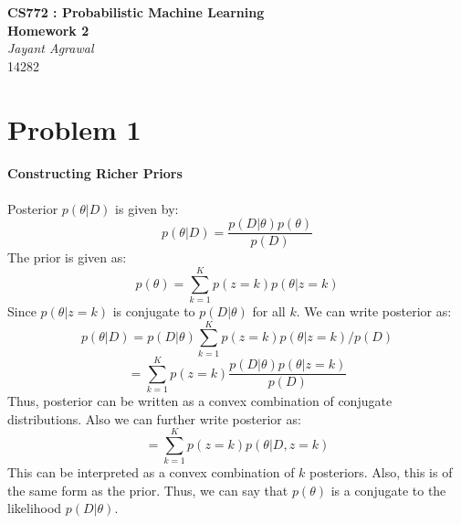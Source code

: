 \documentclass{article}
\begin{document}

\begin{center}
\textbf{\huge CS772 : Probabilistic Machine Learning} \\
\textbf{\huge Homework 2} \\
\vspace{5pt}
\textit{\Large Jayant Agrawal} \\
14282
\end{center}

\section*{Problem 1}
\textbf{Constructing Richer Priors \\ \\}
Posterior $p(\theta|D)$ is given by:
$$p(\theta|D) = \frac{p(D|\theta)p(\theta)}{p(D)}$$
The prior is given as:
$$p(\theta) = \sum_{k=1}^Kp(z=k)p(\theta|z=k)$$
Since $p(\theta|z=k)$ is conjugate to $p(D|\theta)$ for all $k$. We can write posterior as:
$$p(\theta|D) = p(D|\theta)\sum_{k=1}^Kp(z=k)p(\theta|z=k)/p(D)$$
$$ = \sum_{k=1}^K p(z=k)\frac{p(D|\theta)p(\theta|z=k)}{p(D)}$$
Thus, posterior can be written as a convex combination of conjugate distributions. Also we can further write posterior as:
$$ = \sum_{k=1}^K p(z=k)p(\theta|D, z=k)$$
This can be interpreted as a convex combination of $k$ posteriors. Also, this is of the same form as the prior. Thus, we can say that $p(\theta)$ is a conjugate to the likelihood $p(D|\theta)$.
\end{document}
